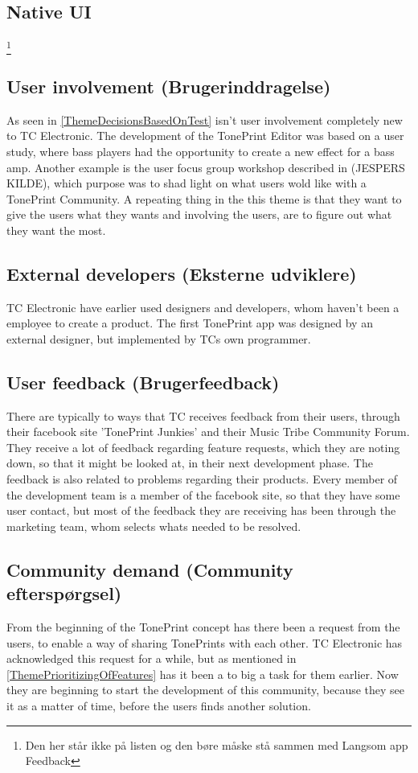 \subsection{Native UI}
\label{ThemeNativeUI}
\footnote{Den her står ikke på listen og den børe måske stå sammen med Langsom app Feedback}

\subsection*{User involvement (Brugerinddragelse)} 
\label{ThemeUserInvolvement}
As seen in \autoref{ThemeDecisionsBasedOnTest} isn't user involvement completely new to TC Electronic. The development of the TonePrint Editor was based on a user study, where bass players had the opportunity to create a new effect for a bass amp. Another example is the user focus group workshop described in (JESPERS KILDE), which purpose was to shad light on what users wold like with a TonePrint Community. A repeating thing in the this theme is that they want to give the users what they wants and involving the users, are to figure out what they want the most.


\subsection*{External developers (Eksterne udviklere)} 
\label{ThemeExternalDevelopers}
TC Electronic have earlier used designers and developers, whom haven't been a employee to create a product. The first TonePrint app was designed by an external designer, but implemented by TCs own programmer. 

\subsection*{User feedback (Brugerfeedback)} 
\label{ThemeUserFeedback}
There are typically to ways that TC receives feedback from their users, through their facebook site 'TonePrint Junkies' and their Music Tribe Community Forum. They receive a lot of feedback regarding feature requests, which they are noting down, so that it might be looked at, in their next development phase. The feedback is also related to problems regarding their products. Every member of the development team is a member of the facebook site, so that they have some user contact, but most of the feedback they are receiving has been through the marketing team, whom selects whats needed to be resolved.

\subsection*{Community demand (Community efterspørgsel)} 
\label{ThemeCommunityDemand}
From the beginning of the TonePrint concept has there been a request from the users, to enable a way of sharing TonePrints with each other. TC Electronic has acknowledged this request for a while, but as mentioned in \autoref{ThemePrioritizingOfFeatures} has it been a to big a task for them earlier. Now they are beginning to start the development of this community, because they see it as a matter of time, before the users finds another solution.

